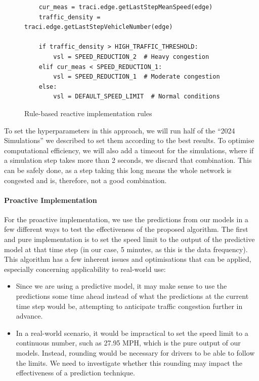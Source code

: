 \begin{figure}[!ht]
  \centering
   \begin{verbatim}
    cur_meas = traci.edge.getLastStepMeanSpeed(edge)
    traffic_density = traci.edge.getLastStepVehicleNumber(edge)
    
    if traffic_density > HIGH_TRAFFIC_THRESHOLD:
        vsl = SPEED_REDUCTION_2  # Heavy congestion
    elif cur_meas < SPEED_REDUCTION_1:
        vsl = SPEED_REDUCTION_1  # Moderate congestion
    else:
        vsl = DEFAULT_SPEED_LIMIT  # Normal conditions
    \end{verbatim}
  \caption{Rule-based reactive implementation rules}
  \label{fig:reactive-code}
\end{figure}

To set the hyperparameters in this approach, we will run half of the “2024 Simulations” we described to set them according to the best results. To optimise computational efficiency, we will also add a timeout for the simulations, where if a simulation step takes more than 2 seconds, we discard that combination. This can be safely done, as a step taking this long means the whole network is congested and is, therefore, not a good combination.

\paragraph{Proactive Implementation}
For the proactive implementation, we use the predictions from our models in a few different ways to test the effectiveness of the proposed algorithm. The first and pure implementation is to set the speed limit to the output of the predictive model at that time step (in our case, 5 minutes, as this is the data frequency). This algorithm has a few inherent issues and optimisations that can be applied, especially concerning applicability to real-world use:
\begin{itemize}
    \item Since we are using a predictive model, it may make sense to use the predictions some time ahead instead of what the predictions at the current time step would be, attempting to anticipate traffic congestion further in advance.
    \item In a real-world scenario, it would be impractical to set the speed limit to a continuous number, such as 27.95 MPH, which is the pure output of our models. Instead, rounding would be necessary for drivers to be able to follow the limits. We need to investigate whether this rounding may impact the effectiveness of a prediction technique.
\end{itemize}

